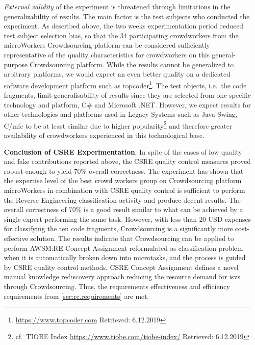\emph{External validity} of the experiment is threatened through limitations in the generalizability of results.
The main factor is the test subjects who conducted the experiment.
As described above, the two weeks experimentation period reduced test subject selection bias, so that the 34 participating crowdworkers from the microWorkers \gls{Crowdsourcing} platform can be considered sufficiently representative of the quality characteristics for crowdworkers on this general-purpose \gls{Crowdsourcing} platform.
While the results cannot be generalized to arbitrary platforms, we would expect an even better quality on a dedicated software development platform such as topcoder\footnote{\url{https://www.topcoder.com} Retrieved: 6.12.2019}.
The test objects, i.e.~the code fragments, limit generalisability of results since they are selected from one specific technology and platform, C\# and Microsoft .NET.
However, we expect results for other technologies and platforms used in \glspl{Legacy System} such as Java Swing, C/\cpp \gls{mfc} to be at least similar due to higher popularity\footnote{cf.~TIOBE Index \url{ https://www.tiobe.com/tiobe-index/} Retrieved: 6.12.2019} and therefore greater availability of crowdworkers experienced in this technological base.

\textbf{Conclusion of CSRE Experimentation}. In spite of the cases of low quality and fake contributions reported
above, the CSRE quality control measures proved robust enough to yield 70\% overall correctness.
The experiment has shown that the expertise level of the best crowd workers group on \gls{Crowdsourcing} platform microWorkers in combination with CSRE quality control is sufficient to perform the \gls{Reverse Engineering} classification activity and produce decent results.
The overall correctness of 70\% is a good result similar to what can be achieved by a single expert performing the same task.
However, with less than 20 USD expenses for classifying the ten code fragments, \gls{Crowdsourcing} is a significantly
more cost-effective solution.
The results indicate that \gls{Crowdsourcing} can be applied to perform AWSM:RE \gls{Concept Assignment} reformulated as classification problem when it is automatically broken down into microtasks, and the process is guided by CSRE quality control methods.
CSRE \gls{Concept Assignment} defines a novel manual knowledge rediscovery approach reducing the resource demand for \glspl{isv} through \gls{Crowdsourcing}.
Thus, the requirements effectiveness and efficiency requirements from \cref{sec:re.requirements} are met.

